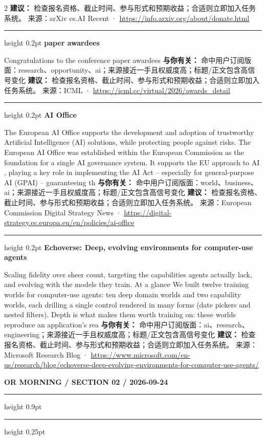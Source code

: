 \documentclass[10.5pt]{ctexart}
\begin{document}
\begin{multicols}{2}
\textbf{建议：} 检查报名资格、截止时间、参与形式和预期收益；合适则立即加入任务系统。
{\footnotesize\color{ormuted} 来源：arXiv cs.AI Recent · \url{https://info.arxiv.org/about/donate.html}}
\vspace{2mm}
\hrule height 0.2pt
\vspace{2mm}
{\large\bfseries paper awardees}\par
Congratulations to the conference paper awardees
\textbf{与你有关：} 命中用户订阅版面：research、opportunity、ai；来源接近一手且权威度高；标题/正文包含高信号变化
\textbf{建议：} 检查报名资格、截止时间、参与形式和预期收益；合适则立即加入任务系统。
{\footnotesize\color{ormuted} 来源：ICML · \url{https://icml.cc/virtual/2026/awards_detail}}
\vspace{2mm}
\hrule height 0.2pt
\vspace{2mm}
{\large\bfseries AI Office}\par
The European AI Office supports the development and adoption of trustworthy Artificial Intelligence (AI) solutions, while protecting people against risks. The European AI Office was established within the European Commission as the foundation for a single AI governance system. It supports the EU approach to AI , playing a key role in implementing the AI Act – especially for general-purpose AI (GPAI) – guaranteeing th
\textbf{与你有关：} 命中用户订阅版面：world、business、ai；来源接近一手且权威度高；标题/正文包含高信号变化
\textbf{建议：} 检查报名资格、截止时间、参与形式和预期收益；合适则立即加入任务系统。
{\footnotesize\color{ormuted} 来源：European Commission Digital Strategy News · \url{https://digital-strategy.ec.europa.eu/en/policies/ai-office}}
\vspace{2mm}
\hrule height 0.2pt
\vspace{2mm}
{\large\bfseries Echoverse: Deep, evolving environments for computer-use agents}\par
Scaling fidelity over sheer count, targeting the capabilities agents actually lack, and evolving with the models they train. At a glance We built twelve training worlds for computer-use agents: ten deep domain worlds and two capability worlds, each drilling a single control rendered in many forms (date pickers and nested filters). Depth is what makes them worth training on: these worlds reproduce an application’s rea
\textbf{与你有关：} 命中用户订阅版面：ai、research、engineering；来源接近一手且权威度高；标题/正文包含高信号变化
\textbf{建议：} 检查报名资格、截止时间、参与形式和预期收益；合适则立即加入任务系统。
{\footnotesize\color{ormuted} 来源：Microsoft Research Blog · \url{https://www.microsoft.com/en-us/research/blog/echoverse-deep-evolving-environments-for-computer-use-agents/}}
\end{multicols}
\newpage
{\small\bfseries OR MORNING / SECTION 02 / 2026-09-24}
\vspace{2mm}
\hrule height 0.9pt
\vspace{1.5mm}
\hrule height 0.25pt
\vspace{4mm}
\end{document}
